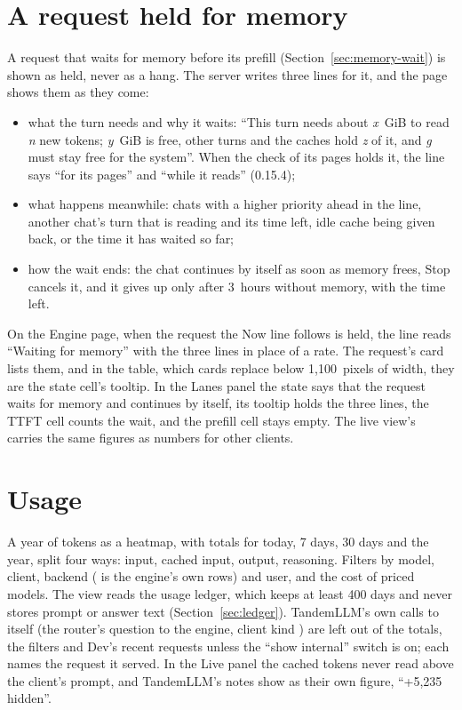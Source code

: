 \section{A request held for memory}\label{sec:dash-held}

A request that waits for memory before its prefill (Section~\ref{sec:memory-wait}) is shown as held, never as a hang. The server writes three lines for it, and the page shows them as they come:

\begin{itemize}
\item what the turn needs and why it waits: \enquote{This turn needs about \textit{x}~GiB to read \textit{n} new tokens; \textit{y}~GiB is free, other turns and the caches hold \textit{z} of it, and \textit{g} must stay free for the system}. When the check of its pages holds it, the line says \enquote{for its pages} and \enquote{while it reads} (0.15.4);
\item what happens meanwhile: chats with a higher priority ahead in the line, another chat's turn that is reading and its time left, idle cache being given back, or the time it has waited so far;
\item how the wait ends: the chat continues by itself as soon as memory frees, Stop cancels it, and it gives up only after 3~hours without memory, with the time left.
\end{itemize}

On the Engine page, when the request the Now line follows is held, the line reads \enquote{Waiting for memory} with the three lines in place of a rate. The request's card lists them, and in the table, which cards replace below 1,100~pixels of width, they are the state cell's tooltip. In the Lanes panel the state says that the request waits for memory and continues by itself, its tooltip holds the three lines, the TTFT cell counts the wait, and the prefill cell stays empty. The live view's  carries the same figures as numbers for other clients.

\section{Usage}

A year of tokens as a heatmap, with totals for today, 7 days, 30 days and the year, split four ways: input, cached input, output, reasoning. Filters by model, client, backend ( is the engine's own rows) and user, and the cost of priced models. The view reads the usage ledger, which keeps at least 400 days and never stores prompt or answer text (Section~\ref{sec:ledger}). TandemLLM's own calls to itself (the router's question to the engine, client kind ) are left out of the totals, the filters and Dev's recent requests unless the \enquote{show internal} switch is on; each names the request it served. In the Live panel the cached tokens never read above the client's prompt, and TandemLLM's notes show as their own figure, \enquote{+5,235 hidden}.

